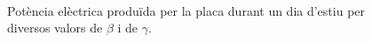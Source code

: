 \documentclass[11pt]{article}
\begin{document}
\begin{figure}[H]
    \centering
        \includegraphics[width=0.75]{dia_estiu_pot_plot.png}
        \label{fig: potencia dia 170}
    \caption{Potència elèctrica produïda per la placa durant un dia d'estiu per diversos valors de $\beta$ i de $\gamma$.}
    \label{potencia dia estiu}
\end{figure}
\end{document}
